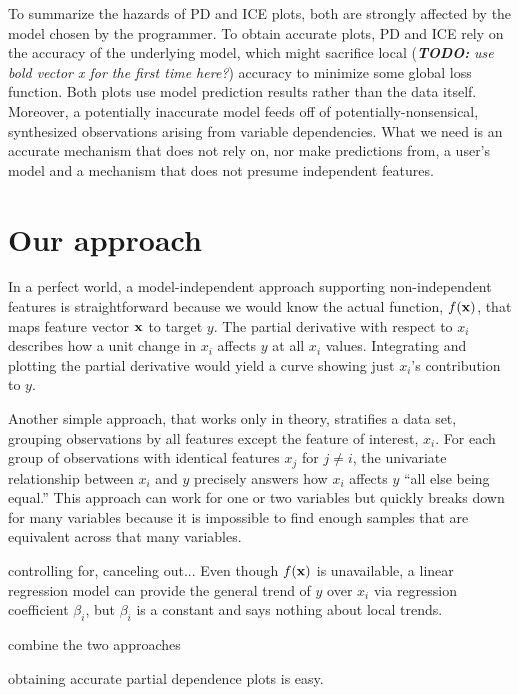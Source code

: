 \documentclass[12pt]{article}
\newcommand{\todo}[1]{{\bf\em TODO:} {\em #1}}
\begin{document}
To summarize the hazards of PD and ICE plots, both are strongly affected by the model chosen by the programmer.  To obtain accurate plots, PD and ICE rely on the accuracy of the underlying model, which might sacrifice local (\todo{use bold vector x for the first time here?}) accuracy to minimize some global loss function. Both plots use model prediction results rather than the data itself. Moreover, a potentially inaccurate model feeds off of potentially-nonsensical, synthesized observations arising from variable dependencies. What we need is an accurate mechanism that does not rely on, nor make predictions from, a user's model and a mechanism that does not presume independent features.

\section{Our approach}

In a perfect world, a model-independent approach supporting non-independent features is straightforward because we would know the actual function, $f(\bf x)$, that maps feature vector $\bf x$ to target $y$.  The partial derivative with respect to $x_i$ describes how a unit change in $x_i$ affects $y$ at all $x_i$ values. Integrating and plotting the partial derivative would yield a curve showing just $x_i$'s contribution to $y$. 

Another simple approach, that works only in theory, stratifies a data set, grouping observations by all features except the feature of interest, $x_i$. For each group of observations with identical features $x_j$ for $j \neq i$, the univariate relationship between $x_i$ and $y$ precisely answers how $x_i$ affects $y$ ``all else being equal.''  This approach can work for one or two variables but quickly breaks down for many variables because it is impossible to find enough samples that are equivalent across that many variables.

controlling for, canceling out... Even though $f(\bf x)$ is unavailable, a linear regression model can provide the general trend of $y$ over $x_i$ via regression coefficient $\beta_i$, but $\beta_i$ is a constant and says nothing about local trends.

combine the two approaches

obtaining accurate partial dependence plots is easy.
\end{document}
